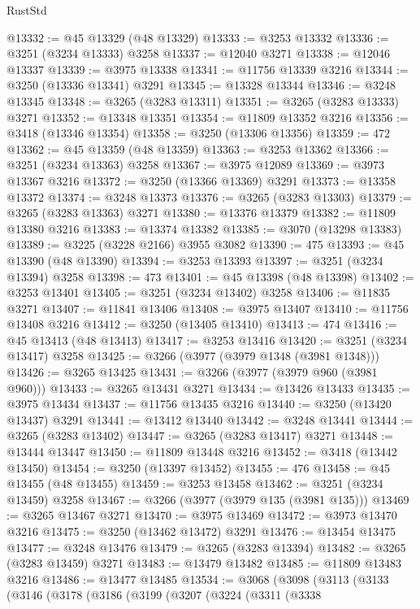 \begin{lexlean}{RustStd}
\begin{coremodule}
@13332 := @45 @13329 (@48 @13329)
@13333 := @3253 @13332
@13336 := @3251 (@3234 @13333) @3258
@13337 := @12040 @3271
@13338 := @12046 @13337
@13339 := @3975 @13338
@13341 := @11756 @13339 @3216
@13344 := @3250 (@13336 @13341) @3291
@13345 := @13328 @13344
@13346 := @3248 @13345
@13348 := @3265 (@3283 @13311)
@13351 := @3265 (@3283 @13333) @3271
@13352 := @13348 @13351
@13354 := @11809 @13352 @3216
@13356 := @3418 (@13346 @13354)
@13358 := @3250 (@13306 @13356)
@13359 := 472
@13362 := @45 @13359 (@48 @13359)
@13363 := @3253 @13362
@13366 := @3251 (@3234 @13363) @3258
@13367 := @3975 @12089
@13369 := @3973 @13367 @3216
@13372 := @3250 (@13366 @13369) @3291
@13373 := @13358 @13372
@13374 := @3248 @13373
@13376 := @3265 (@3283 @13303)
@13379 := @3265 (@3283 @13363) @3271
@13380 := @13376 @13379
@13382 := @11809 @13380 @3216
@13383 := @13374 @13382
@13385 := @3070 (@13298 @13383)
@13389 := @3225 (@3228 @2166) @3955 @3082
@13390 := 475
@13393 := @45 @13390 (@48 @13390)
@13394 := @3253 @13393
@13397 := @3251 (@3234 @13394) @3258
@13398 := 473
@13401 := @45 @13398 (@48 @13398)
@13402 := @3253 @13401
@13405 := @3251 (@3234 @13402) @3258
@13406 := @11835 @3271
@13407 := @11841 @13406
@13408 := @3975 @13407
@13410 := @11756 @13408 @3216
@13412 := @3250 (@13405 @13410)
@13413 := 474
@13416 := @45 @13413 (@48 @13413)
@13417 := @3253 @13416
@13420 := @3251 (@3234 @13417) @3258
@13425 := @3266 (@3977 (@3979 @1348 (@3981 @1348)))
@13426 := @3265 @13425
@13431 := @3266 (@3977 (@3979 @960 (@3981 @960)))
@13433 := @3265 @13431 @3271
@13434 := @13426 @13433
@13435 := @3975 @13434
@13437 := @11756 @13435 @3216
@13440 := @3250 (@13420 @13437) @3291
@13441 := @13412 @13440
@13442 := @3248 @13441
@13444 := @3265 (@3283 @13402)
@13447 := @3265 (@3283 @13417) @3271
@13448 := @13444 @13447
@13450 := @11809 @13448 @3216
@13452 := @3418 (@13442 @13450)
@13454 := @3250 (@13397 @13452)
@13455 := 476
@13458 := @45 @13455 (@48 @13455)
@13459 := @3253 @13458
@13462 := @3251 (@3234 @13459) @3258
@13467 := @3266 (@3977 (@3979 @135 (@3981 @135)))
@13469 := @3265 @13467 @3271
@13470 := @3975 @13469
@13472 := @3973 @13470 @3216
@13475 := @3250 (@13462 @13472) @3291
@13476 := @13454 @13475
@13477 := @3248 @13476
@13479 := @3265 (@3283 @13394)
@13482 := @3265 (@3283 @13459) @3271
@13483 := @13479 @13482
@13485 := @11809 @13483 @3216
@13486 := @13477 @13485
@13534 := @3068
    (@3098
      (@3113
        (@3133
          (@3146
            (@3178
              (@3186
                (@3199
                  (@3207
                    (@3224
                      (@3311
                        (@3338

\end{coremodule}
\end{lexlean}
